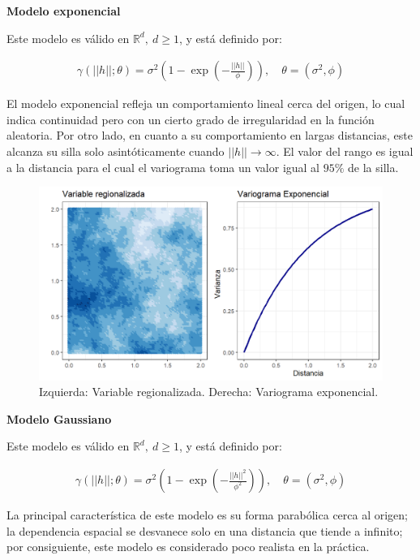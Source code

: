 \documentclass[
]{book}
\begin{document}
\textbf{Modelo exponencial}

Este modelo es válido en \(\mathbb{R}^d,\ d\geq 1\), y está definido por:

\begin{align*}
    \gamma(||h||;\theta)=\sigma^2 \left(1-\exp\left(-\frac{||h||}{\phi}\right) \right),\quad \theta=(\sigma^2,\phi)
\end{align*}

El modelo exponencial refleja un comportamiento lineal cerca del origen, lo cual indica continuidad pero con un cierto grado de irregularidad en la función aleatoria. Por otro lado, en cuanto a su comportamiento en largas distancias, este alcanza su silla solo asintóticamente cuando \(||h||\to \infty\). El valor del rango es igual a la distancia para el cual el variograma toma un valor igual al \(95\%\) de la silla.

\begin{figure}
\includegraphics[width=17.78in]{figuras/otros/exp_var} \caption{Izquierda: Variable regionalizada. Derecha: Variograma exponencial.}\label{fig:unnamed-chunk-3}
\end{figure}

\textbf{Modelo Gaussiano}

Este modelo es válido en \(\mathbb{R}^d,\ d\geq 1\), y está definido por:

\begin{align*}
    \gamma(||h||;\theta)=\sigma^2\left(1-\exp\left(-\frac{||h||^2}{\phi^2} \right) \right),\quad \theta=(\sigma^2,\phi)
\end{align*}

La principal característica de este modelo es su forma parabólica cerca al origen; la dependencia espacial se desvanece solo en una distancia que tiende a infinito; por consiguiente, este modelo es considerado poco realista en la práctica.
\end{document}
